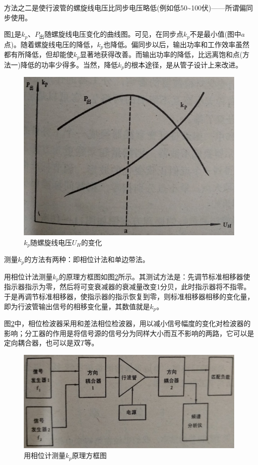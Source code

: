 方法之二是使行波管的螺旋线电压比同步电压略低(例如低50\textasciitilde100伏)——所谓偏同步使用。


图\ref{ch11-14}是$ k_p $、$ P_\textrm{出} $随螺旋线电压变化的曲线图。可见，在同步点$ k_p $不是最小值(图中$ a $点)。随着螺旋线电压的降低，$ k_p $也降低。偏同步以后，输出功率和工作效率虽然都有所降低，但却能使$ k_p $显著地获得改善。而输出功率的降低，比远离饱和点(方法一)降低的功率少得多。当然，降低$ k_p $的根本途径，是从管子设计上来改进。

\begin{figure}[phtb]
	\centering
	\includegraphics[width=0.6\linewidth]{figure/ch11-14}
	\caption{$ k_p $随螺旋线电压$ U_H $的变化}
	\label{ch11-14}
\end{figure}

测量$ k_p $的方法有两种：即相位计法和单边带法。


用相位计法测量$ k_p $的原理方框图如图\ref{ch11-15}所示。其测试方法是：先调节标准相移器使指示器指示为零，然后将可变衰减器的衰减量改变1分贝，此时指示器将不指零。于是再调节标准相移器，使指示器的指示恢复到零，则标准相移器相移的变化量，即为行波管输出信号的相移变化量，其数值就是$ k_p $。

图\ref{ch11-15}中，相位检波器采用和差法相位检波器，用以减小信号幅度的变化对检波器的影响；分工器的作用是将信号源的信号分为同样大小而互不影响的两路，它可以是定向耦合器，也可以是双$ T $等。

\begin{figure}[phtb]
	\centering
	\includegraphics[width=0.6\linewidth]{figure/ch11-15}
	\caption{用相位计测量$ k_p $原理方框图}
	\label{ch11-15}
\end{figure}

